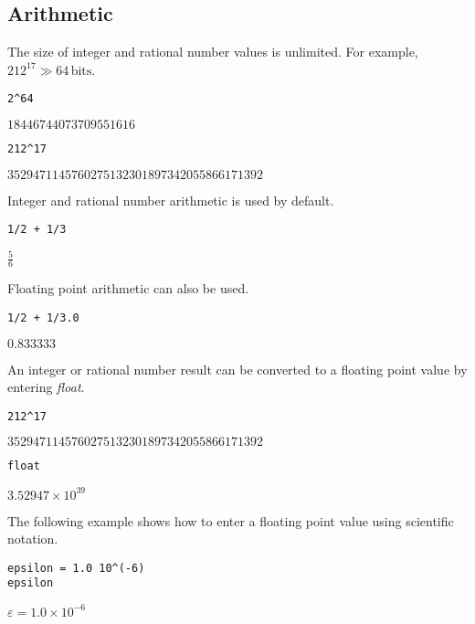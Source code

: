 \subsection{Arithmetic}

\noindent
The size of integer and rational number values is unlimited.
For example, $212^{17}\gg64\,\text{bits}$.

\begin{Verbatim}[formatcom=\color{blue}]
2^64
\end{Verbatim}

\noindent
$\displaystyle 18446744073709551616$

\begin{Verbatim}[formatcom=\color{blue}]
212^17
\end{Verbatim}

\noindent
$\displaystyle 3529471145760275132301897342055866171392$

\bigskip
\noindent
Integer and rational number arithmetic is used by default.

\begin{Verbatim}[formatcom=\color{blue}]
1/2 + 1/3
\end{Verbatim}

\noindent
$\displaystyle \tfrac{5}{6}$

\bigskip
\noindent
Floating point arithmetic can also be used.

\begin{Verbatim}[formatcom=\color{blue}]
1/2 + 1/3.0
\end{Verbatim}

\noindent
$\displaystyle 0.833333$

\bigskip
\noindent
An integer or rational number result can be converted to a floating
point value by entering {\it float}.

\begin{Verbatim}[formatcom=\color{blue}]
212^17
\end{Verbatim}

\noindent
$\displaystyle 3529471145760275132301897342055866171392$

\begin{Verbatim}[formatcom=\color{blue}]
float
\end{Verbatim}

\noindent
$\displaystyle 3.52947\times10^{39}$

\bigskip
\noindent
The following example shows how to enter a floating point value
using scientific notation.

\begin{Verbatim}[formatcom=\color{blue}]
epsilon = 1.0 10^(-6)
epsilon
\end{Verbatim}

\noindent
$\displaystyle \varepsilon=1.0\times10^{-6}$
